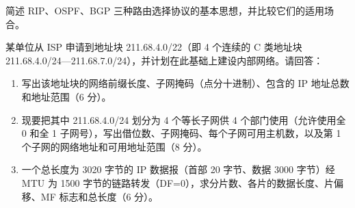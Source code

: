 \documentclass[a4paper,11pt]{article}
\begin{document}
\q 简述 RIP、OSPF、BGP 三种路由选择协议的基本思想，并比较它们的适用场合。\anslines{4cm}

\q 某单位从 ISP 申请到地址块 211.68.4.0/22（即 4 个连续的 C 类地址块 211.68.4.0/24—211.68.7.0/24），并计划在此基础上建设内部网络。请回答：
\begin{enumerate}[leftmargin=2em, itemsep=1pt, topsep=2pt]
  \item 写出该地址块的网络前缀长度、子网掩码（点分十进制）、包含的 IP 地址总数和地址范围（6 分）。
  \item 现要把其中 211.68.4.0/24 划分为 4 个等长子网供 4 个部门使用（允许使用全 0 和全 1 子网号），写出借位数、子网掩码、每个子网可用主机数，以及第 1 个子网的网络地址和可用地址范围（8 分）。
  \item 一个总长度为 3020 字节的 IP 数据报（首部 20 字节、数据 3000 字节）经 MTU 为 1500 字节的链路转发（DF=0），求分片数、各片的数据长度、片偏移、MF 标志和总长度（6 分）。
\end{enumerate}
\anslines{8cm}
\end{document}
